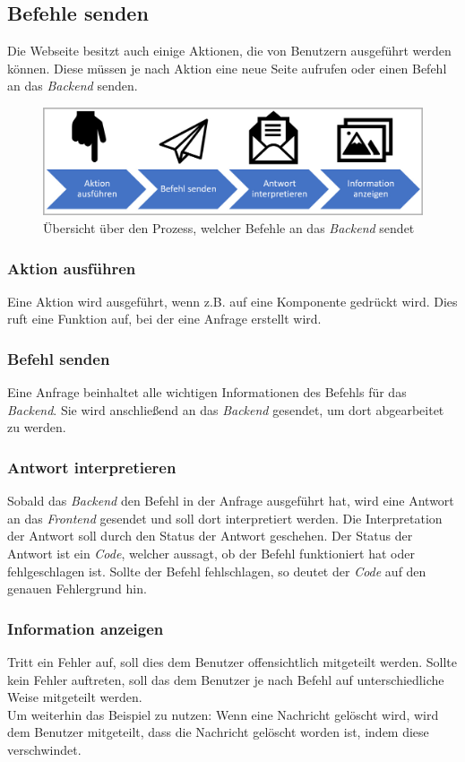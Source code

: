 \subsection{Befehle senden}
Die Webseite besitzt auch einige Aktionen, die von Benutzern ausgeführt werden können. Diese müssen je nach Aktion eine neue Seite aufrufen oder einen Befehl an das \textit{Backend} senden.

\begin{figure}[H]
	\centering
	\includegraphics[width=0.8\linewidth]{images/rfoster_konzept/Prozess_Befehl_senden}
	\caption[Prozess der Befehlssendung]{Übersicht über den Prozess, welcher Befehle an das \textit{Backend} sendet}
	\label{fig:prozessbefehlsenden}
\end{figure}

\subsubsection{Aktion ausführen}
Eine Aktion wird ausgeführt, wenn z.B. auf eine Komponente gedrückt wird. Dies ruft eine Funktion auf, bei der eine Anfrage erstellt wird.

\subsubsection{Befehl senden}
Eine Anfrage beinhaltet alle wichtigen Informationen des Befehls für das \textit{Backend}. Sie wird anschließend an das \textit{Backend} gesendet, um dort abgearbeitet zu werden.

\subsubsection{Antwort interpretieren}
Sobald das \textit{Backend} den Befehl in der Anfrage ausgeführt hat, wird eine Antwort an das \textit{Frontend} gesendet und soll dort interpretiert werden. Die Interpretation der Antwort soll durch den Status der Antwort geschehen. Der Status der Antwort ist ein \textit{Code}, welcher aussagt, ob der Befehl funktioniert hat oder fehlgeschlagen ist. Sollte der Befehl fehlschlagen, so deutet der \textit{Code} auf den genauen Fehlergrund hin.

\subsubsection{Information anzeigen}
Tritt ein Fehler auf, soll dies dem Benutzer offensichtlich mitgeteilt werden. Sollte kein Fehler auftreten, soll das dem Benutzer je nach Befehl auf unterschiedliche Weise mitgeteilt werden.\\
Um weiterhin das Beispiel zu nutzen: Wenn eine Nachricht gelöscht wird, wird dem Benutzer mitgeteilt, dass die Nachricht gelöscht worden ist, indem diese verschwindet.